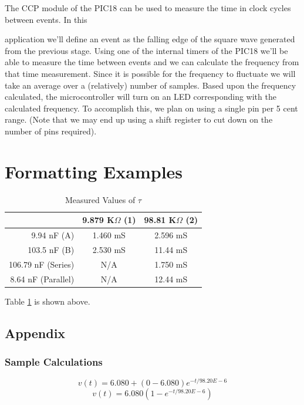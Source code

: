 \documentclass[12pt]{article}
\begin{document}
The CCP module of the PIC18 can be used to measure the time in clock cycles between events. In this

application we'll define an event as the falling edge of the square wave generated from the previous
stage. Using one of the internal timers of the PIC18 we'll be able to measure the time between events
and we can calculate the frequency from that time measurement. Since it is possible for the frequency
to fluctuate we will take an average over a (relatively) number of samples. Based upon the frequency
calculated, the microcontroller will turn on an LED corresponding with the calculated frequency. To
accomplish this, we plan on using a single pin per 5 cent range. (Note that we may end up using a shift
register to cut down on the number of pins required).

\section{Formatting Examples}

\begin{table}[H]
\centering
\caption{\label{measured_tau}Measured Values of $\tau$}
\begin{tabular}{|r|c|c|}
\hline
 			&9.879 K$\Omega$ (1)	&98.81 K$\Omega$ (2)	\\	\hline	
9.94 nF (A)		&1.460 mS	&2.596 mS	\\  \hline
103.5 nF (B)		&2.530 mS	&11.44 mS	\\  \hline
106.79 nF (Series)	&N/A		&1.750 mS	\\  \hline
8.64 nF (Parallel)	&N/A		&12.44 mS	\\  \hline
\end{tabular}
\end{table}
 Table \ref{measured_tau} is shown above.

\subsection{Appendix}
\subsubsection{Sample Calculations}
\begin{equation}
	v(t) = 6.080 + ( 0 - 6.080)e^{-t/98.20E-6}
\end{equation}
\begin{equation}
	v(t) = 6.080(1 - e^{-t/98.20E-6})
\end{equation}

%	
\end{document}
